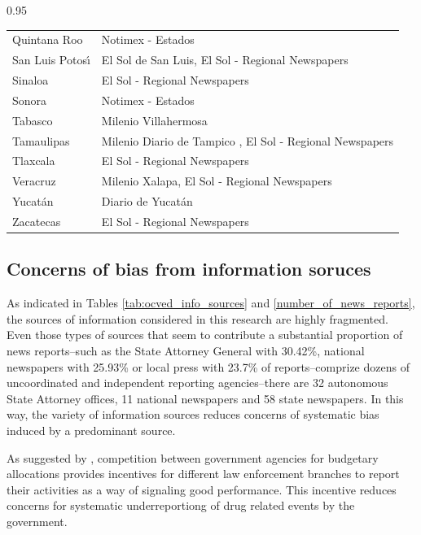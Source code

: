 \documentclass[12pt,letterpaper]{article}
\begin{document}
\begin{table}[h!]
\begin{spacing}{0.95}
\begin{tabular}{|ll|}
Quintana Roo  &  Notimex - Estados \\
San Luis Potos\'{\i}  &  El Sol de San Luis, El Sol - Regional Newspapers   \\
Sinaloa  &  El Sol - Regional Newspapers   \\
Sonora  &  Notimex - Estados \\
Tabasco  &  Milenio Villahermosa   \\
Tamaulipas  &  Milenio Diario de Tampico ,  El Sol - Regional Newspapers   \\
Tlaxcala  &  El Sol - Regional Newspapers   \\
Veracruz   &  Milenio Xalapa, El Sol - Regional Newspapers   \\
Yucat\'{a}n  &  Diario de Yucat\'{a}n   \\
Zacatecas  &  El Sol - Regional Newspapers   \\
\hline  
\end{tabular}
\end{spacing}
\end{table}





\clearpage

\subsection{Concerns of bias from information soruces}

As indicated in Tables \ref{tab:ocved_info_sources} and \ref{number_of_news_reports}, the sources of information considered in this research are highly fragmented. Even those types of sources that seem to contribute a substantial proportion of news reports--such as the State Attorney General with 30.42\%, national newspapers with 25.93\% or local press with 23.7\% of reports--comprize dozens of uncoordinated and independent reporting agencies--there are 32 autonomous State Attorney offices, 11 national newspapers and 58 state newspapers. In this way, the variety of information sources reduces concerns of systematic bias induced by a predominant source. 

As suggested by \citet{Andreas2010}, competition between government agencies for budgetary allocations provides incentives for different law enforcement branches to report their activities as a way of signaling good performance. This incentive reduces concerns for systematic underreportiong of drug related events by the government.  
\end{document}
